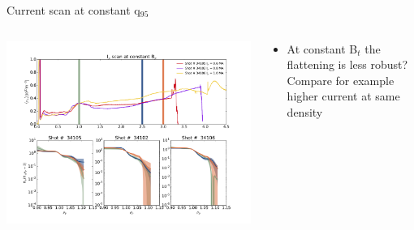 \documentclass[10pt, compress]{beamer}
\newcommand\Fontvi{\fontsize{8}{7.2}\selectfont}
\begin{document}
\begin{frame}{Current scan at constant q$_95$}
  \Fontvi
  \begin{columns}
    \begin{column}{0.6\textwidth}
      \includegraphics[width=\textwidth]{../../Experiments/AUG/analysis/pdfbox/IpConstantBt_density}
    \end{column}
    \begin{column}{0.4\textwidth}
      \begin{itemize}
        \item At constant B$_t$ the flattening is less robust? Compare
          for example higher current at same density
      \end{itemize}
    \end{column}
  \end{columns}
\end{frame}
\end{document}
